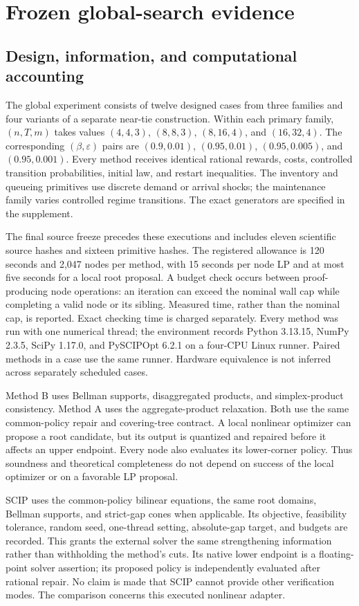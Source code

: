 \section{Frozen global-search evidence}\label{sec:evidence45}
\subsection{Design, information, and computational accounting}
The global experiment consists of twelve designed cases from three families and four variants of a separate near-tie construction. Within each primary family, $(n,T,m)$ takes values $(4,4,3)$, $(8,8,3)$, $(8,16,4)$, and $(16,32,4)$. The corresponding $(\beta,\varepsilon)$ pairs are $(0.9,0.01)$, $(0.95,0.01)$, $(0.95,0.005)$, and $(0.95,0.001)$. Every method receives identical rational rewards, costs, controlled transition probabilities, initial law, and restart inequalities. The inventory and queueing primitives use discrete demand or arrival shocks; the maintenance family varies controlled regime transitions. The exact generators are specified in the supplement.

The final source freeze precedes these executions and includes eleven scientific source hashes and sixteen primitive hashes. The registered allowance is 120 seconds and 2,047 nodes per method, with 15 seconds per node LP and at most five seconds for a local root proposal. A budget check occurs between proof-producing node operations: an iteration can exceed the nominal wall cap while completing a valid node or its sibling. Measured time, rather than the nominal cap, is reported. Exact checking time is charged separately. Every method was run with one numerical thread; the environment records Python 3.13.15, NumPy 2.3.5, SciPy 1.17.0, and PySCIPOpt 6.2.1 on a four-CPU Linux runner. Paired methods in a case use the same runner. Hardware equivalence is not inferred across separately scheduled cases.

Method B uses Bellman supports, disaggregated products, and simplex-product consistency. Method A uses the aggregate-product relaxation. Both use the same common-policy repair and covering-tree contract. A local nonlinear optimizer can propose a root candidate, but its output is quantized and repaired before it affects an upper endpoint. Every node also evaluates its lower-corner policy. Thus soundness and theoretical completeness do not depend on success of the local optimizer or on a favorable LP proposal.

SCIP uses the common-policy bilinear equations, the same root domains, Bellman supports, and strict-gap cones when applicable. Its objective, feasibility tolerance, random seed, one-thread setting, absolute-gap target, and budgets are recorded. This grants the external solver the same strengthening information rather than withholding the method's cuts. Its native lower endpoint is a floating-point solver assertion; its proposed policy is independently evaluated after rational repair. No claim is made that SCIP cannot provide other verification modes. The comparison concerns this executed nonlinear adapter.

